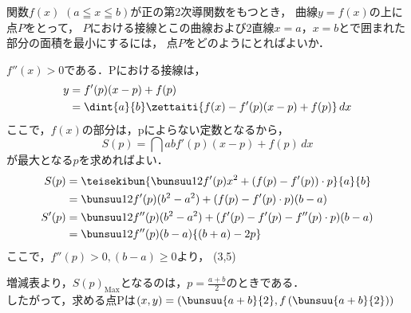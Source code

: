 \begin{problem}
関数$f(x)$ $(a \leqq x \leqq b)$が正の第2次導関数をもつとき，
曲線$y=f(x)$の上に点$P$をとって，
$P$における接線とこの曲線および2直線$x=a$，$x=b$とで囲まれた部分の面積を最小にするには，
点$P$をどのようにとればよいか．
\end{problem}

$f''(x) > 0$である．Pにおける接線は，
\begin{align*}
  y &= f'(p) (x-p) + f(p) \\
  &= \dint{a}{b}\zettaiti{f(x) - f'(p)(x-p) + f(p)}\,dx
\end{align*}
ここで，$f(x)$の部分は，pによらない定数となるから，
\[S(p) = \dint{a}{b}f'(p)(x-p)+f(p)\,dx\]
が最大となる$p$を求めればよい．
\begin{align*}
  S(p) &=
  \teisekibun{\bunsuu12 f'(p)x^2 + (f(p)-f'(p))\cdot p}{a}{b}\\
  &=\bunsuu12 f'(p)(b^2-a^2) + (f(p)-f'(p)\cdot p)(b-a)\\
  S'(p) &= \bunsuu12 f''(p)(b^2-a^2)+(f'(p)-f'(p)-f''(p)\cdot p)(b-a) \\
  &= \bunsuu12 f''(p) (b-a)\{(b+a)-2p\}
\end{align*}
ここで，$f''(p) > 0, (b-a) \geq 0$より，
\RESETKEYA
{}
\zogen(3,5)

増減表より，$S(p)_{\mathrm{Max}}$となるのは，$p = \frac{a+b}{2}$のときである．\\したがって，求める点Pは$(x,y) =\left(\bunsuu{a+b}{2},f\left(\bunsuu{a+b}{2}\right)\right)$
